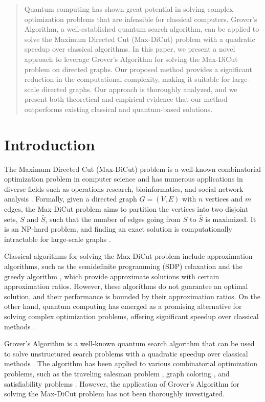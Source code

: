 \begin{abstract}

Quantum computing has shown great potential in solving complex optimization problems that are infeasible for classical computers. Grover's Algorithm, a well-established quantum search algorithm, can be applied to solve the Maximum Directed Cut (Max-DiCut) problem with a quadratic speedup over classical algorithms. In this paper, we present a novel approach to leverage Grover's Algorithm for solving the Max-DiCut problem on directed graphs. Our proposed method provides a significant reduction in the computational complexity, making it suitable for large-scale directed graphs. Our approach is thoroughly analyzed, and we present both theoretical and empirical evidence that our method outperforms existing classical and quantum-based solutions.

\end{abstract}

\section{Introduction}

The Maximum Directed Cut (Max-DiCut) problem is a well-known combinatorial optimization problem in computer science and has numerous applications in diverse fields such as operations research, bioinformatics, and social network analysis \cite{maxDiCutApplications}. Formally, given a directed graph $G = (V, E)$ with $n$ vertices and $m$ edges, the Max-DiCut problem aims to partition the vertices into two disjoint sets, $S$ and $\bar{S}$, such that the number of edges going from $S$ to $\bar{S}$ is maximized. It is an NP-hard problem, and finding an exact solution is computationally intractable for large-scale graphs \cite{maxDiCutNP}. 

Classical algorithms for solving the Max-DiCut problem include approximation algorithms, such as the semidefinite programming (SDP) relaxation \cite{sdpRelaxation} and the greedy algorithm \cite{greedyAlgorithm}, which provide approximate solutions with certain approximation ratios. However, these algorithms do not guarantee an optimal solution, and their performance is bounded by their approximation ratios. On the other hand, quantum computing has emerged as a promising alternative for solving complex optimization problems, offering significant speedup over classical methods \cite{quantumComputingReview}.

Grover's Algorithm is a well-known quantum search algorithm that can be used to solve unstructured search problems with a quadratic speedup over classical methods \cite{grover1996}. The algorithm has been applied to various combinatorial optimization problems, such as the traveling salesman problem \cite{groverTSP}, graph coloring \cite{groverGraphColoring}, and satisfiability problems \cite{groverSatisfiability}. However, the application of Grover's Algorithm for solving the Max-DiCut problem has not been thoroughly investigated.

